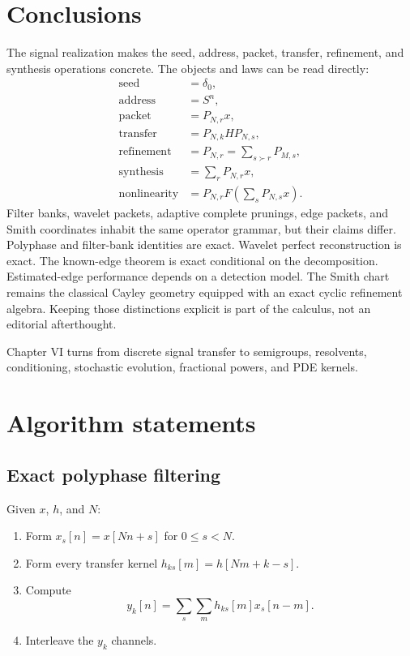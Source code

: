 \documentclass[11pt,letterpaper]{article}
\theoremstyle{plain}
\theoremstyle{plain}
\theoremstyle{plain}
\theoremstyle{definition}
\theoremstyle{definition}
\theoremstyle{definition}
\theoremstyle{definition}
\theoremstyle{remark}
\theoremstyle{remark}
\theoremstyle{remark}
\theoremstyle{remark}
\begin{document}
\section{Conclusions}\label{core:section:17}

The signal realization makes the seed, address, packet, transfer, refinement, and synthesis operations concrete. The objects and laws can be read directly:
\[
\boxed{
\begin{aligned}
\text{seed}&=\delta_0,\\
\text{address}&=S^n,\\
\text{packet}&=P_{N,r}x,\\
\text{transfer}&=P_{N,k}HP_{N,s},\\
\text{refinement}&=P_{N,r}=\sum_{s\succ r}P_{M,s},\\
\text{synthesis}&=\sum_rP_{N,r}x,\\
\text{nonlinearity}&=P_{N,r}F\left(\sum_sP_{N,s}x\right).
\end{aligned}
}
\]
Filter banks, wavelet packets, adaptive complete prunings, edge packets, and Smith coordinates inhabit the same operator grammar, but their claims differ. Polyphase and filter-bank identities are exact. Wavelet perfect reconstruction is exact. The known-edge theorem is exact conditional on the decomposition. Estimated-edge performance depends on a detection model. The Smith chart remains the classical Cayley geometry equipped with an exact cyclic refinement algebra. Keeping those distinctions explicit is part of the calculus, not an editorial afterthought.

Chapter VI turns from discrete signal transfer to semigroups, resolvents, conditioning, stochastic evolution, fractional powers, and PDE kernels.

\appendix
\section{Algorithm statements}\label{core:section:18}

\subsection{Exact polyphase filtering}

Given $x$, $h$, and $N$:

\begin{enumerate}
\item Form $x_s[n]=x[Nn+s]$ for $0\le s<N$.
\item Form every transfer kernel $h_{ks}[m]=h[Nm+k-s]$.
\item Compute
\[
y_k[n]=\sum_s\sum_mh_{ks}[m]x_s[n-m].
\]
\item Interleave the $y_k$ channels.
\end{enumerate}
\end{document}
